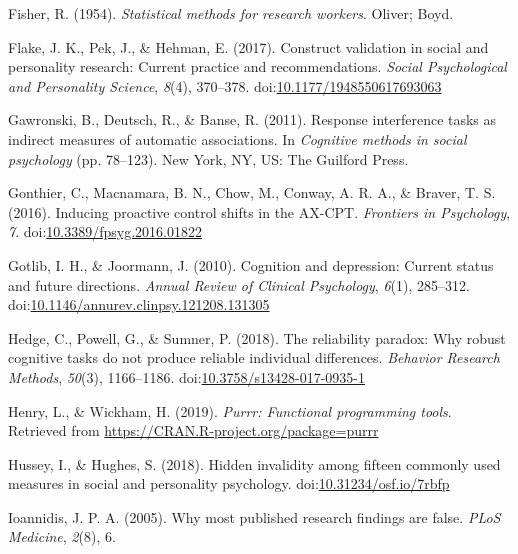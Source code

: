 \documentclass[english,,man,floatsintext]{apa6}
\begin{document}
\leavevmode\hypertarget{ref-fisher_statistical_1954}{}%
Fisher, R. (1954). \emph{Statistical methods for research workers}. Oliver; Boyd.

\leavevmode\hypertarget{ref-flake_construct_2017}{}%
Flake, J. K., Pek, J., \& Hehman, E. (2017). Construct validation in social and personality research: Current practice and recommendations. \emph{Social Psychological and Personality Science}, \emph{8}(4), 370--378. doi:\href{https://doi.org/10.1177/1948550617693063}{10.1177/1948550617693063}

\leavevmode\hypertarget{ref-gawronski_response_2011}{}%
Gawronski, B., Deutsch, R., \& Banse, R. (2011). Response interference tasks as indirect measures of automatic associations. In \emph{Cognitive methods in social psychology} (pp. 78--123). New York, NY, US: The Guilford Press.

\leavevmode\hypertarget{ref-gonthier_inducing_2016}{}%
Gonthier, C., Macnamara, B. N., Chow, M., Conway, A. R. A., \& Braver, T. S. (2016). Inducing proactive control shifts in the AX-CPT. \emph{Frontiers in Psychology}, \emph{7}. doi:\href{https://doi.org/10.3389/fpsyg.2016.01822}{10.3389/fpsyg.2016.01822}

\leavevmode\hypertarget{ref-gotlib_cognition_2010}{}%
Gotlib, I. H., \& Joormann, J. (2010). Cognition and depression: Current status and future directions. \emph{Annual Review of Clinical Psychology}, \emph{6}(1), 285--312. doi:\href{https://doi.org/10.1146/annurev.clinpsy.121208.131305}{10.1146/annurev.clinpsy.121208.131305}

\leavevmode\hypertarget{ref-hedge_reliability_2018}{}%
Hedge, C., Powell, G., \& Sumner, P. (2018). The reliability paradox: Why robust cognitive tasks do not produce reliable individual differences. \emph{Behavior Research Methods}, \emph{50}(3), 1166--1186. doi:\href{https://doi.org/10.3758/s13428-017-0935-1}{10.3758/s13428-017-0935-1}

\leavevmode\hypertarget{ref-R-purrr}{}%
Henry, L., \& Wickham, H. (2019). \emph{Purrr: Functional programming tools}. Retrieved from \url{https://CRAN.R-project.org/package=purrr}

\leavevmode\hypertarget{ref-hussey_hidden_2018}{}%
Hussey, I., \& Hughes, S. (2018). Hidden invalidity among fifteen commonly used measures in social and personality psychology. doi:\href{https://doi.org/10.31234/osf.io/7rbfp}{10.31234/osf.io/7rbfp}

\leavevmode\hypertarget{ref-ioannidis_why_2005}{}%
Ioannidis, J. P. A. (2005). Why most published research findings are false. \emph{PLoS Medicine}, \emph{2}(8), 6.
\end{document}
